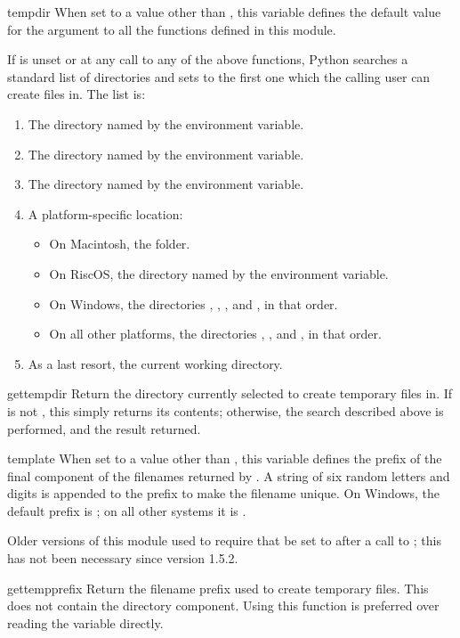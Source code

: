 \begin{datadesc}{tempdir}
When set to a value other than , this variable defines the
default value for the  argument to all the functions defined
in this module.

If  is unset or  at any call to any of the
above functions, Python searches a standard list of directories and
sets  to the first one which the calling user can create
files in.  The list is:

\begin{enumerate}
\item The directory named by the  environment variable.
\item The directory named by the  environment variable.
\item The directory named by the  environment variable.
\item A platform-specific location:
    \begin{itemize}
    \item On Macintosh, the  folder.
    \item On RiscOS, the directory named by the
           environment variable.
    \item On Windows, the directories
          ,
          ,
          , and
          , in that order.
    \item On all other platforms, the directories
          , , and , in that order.
    \end{itemize}
\item As a last resort, the current working directory.
\end{enumerate}
\end{datadesc}

\begin{funcdesc}{gettempdir}{}
Return the directory currently selected to create temporary files in.
If  is not , this simply returns its contents;
otherwise, the search described above is performed, and the result
returned.
\end{funcdesc}

\begin{datadesc}{template}
When set to a value other than , this variable defines the
prefix of the final component of the filenames returned by
.  A string of six random letters and digits is
appended to the prefix to make the filename unique.  On Windows,
the default prefix is ; on all other systems
it is .

Older versions of this module used to require that  be
set to  after a call to ; this has not
been necessary since version 1.5.2.
\end{datadesc}

\begin{funcdesc}{gettempprefix}{}
Return the filename prefix used to create temporary files.  This does
not contain the directory component.  Using this function is preferred
over reading the  variable directly.
\end{funcdesc}
